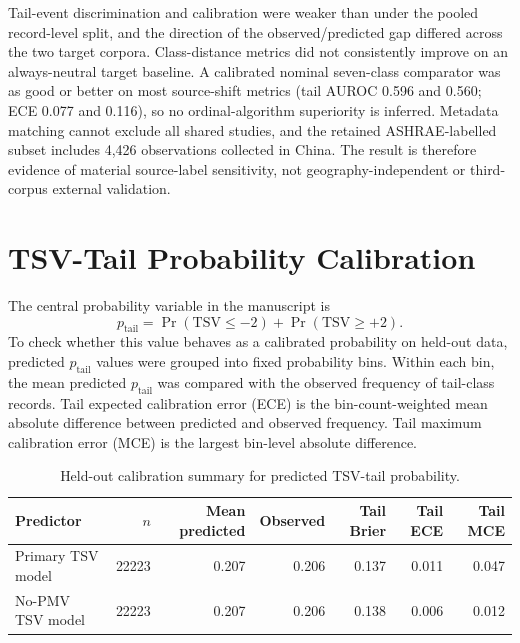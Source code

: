 \documentclass[11pt]{article}
\begin{document}
Tail-event discrimination and calibration were weaker than under the pooled record-level split, and the direction of the observed/predicted gap differed across the two target corpora. Class-distance metrics did not consistently improve on an always-neutral target baseline. A calibrated nominal seven-class comparator was as good or better on most source-shift metrics (tail AUROC 0.596 and 0.560; ECE 0.077 and 0.116), so no ordinal-algorithm superiority is inferred. Metadata matching cannot exclude all shared studies, and the retained ASHRAE-labelled subset includes 4{,}426 observations collected in China. The result is therefore evidence of material source-label sensitivity, not geography-independent or third-corpus external validation.

\section{TSV-Tail Probability Calibration}

The central probability variable in the manuscript is
\begin{equation}
p_{\mathrm{tail}}=\Pr(\mathrm{TSV}\le-2)+\Pr(\mathrm{TSV}\ge+2).
\end{equation}
To check whether this value behaves as a calibrated probability on held-out data, predicted $p_{\mathrm{tail}}$ values were grouped into fixed probability bins. Within each bin, the mean predicted $p_{\mathrm{tail}}$ was compared with the observed frequency of tail-class records. Tail expected calibration error (ECE) is the bin-count-weighted mean absolute difference between predicted and observed frequency. Tail maximum calibration error (MCE) is the largest bin-level absolute difference.

\begin{table}[htbp]
\centering
\caption{Held-out calibration summary for predicted TSV-tail probability.}
\label{tab:supp_tail_calibration_summary}
\footnotesize
\setlength{\tabcolsep}{4.5pt}
\begin{tabular}{lrrrrrr}
\toprule
Predictor & $n$ & Mean predicted & Observed & Tail Brier & Tail ECE & Tail MCE \\
\midrule
Primary TSV model & 22223 & 0.207 & 0.206 & 0.137 & 0.011 & 0.047 \\
No-PMV TSV model & 22223 & 0.207 & 0.206 & 0.138 & 0.006 & 0.012 \\
\bottomrule
\end{tabular}
\end{table}
\end{document}
